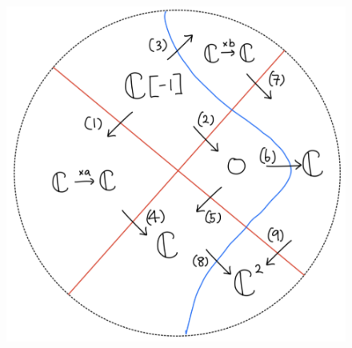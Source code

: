\begin{figure}[H]
    \centering
    \includegraphics[scale = 0.45]{diagrams/lemma4/21.png}
    \caption{}
    \label{fig:your-label}
\end{figure}

